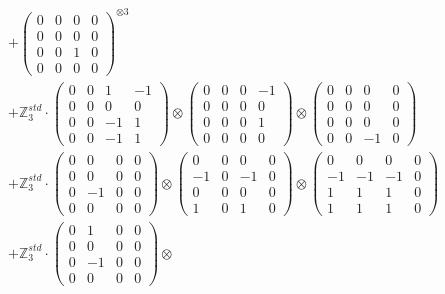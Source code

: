 \documentclass{article}
\begin{document}
{\begin{align}
        &+ \label{Rs16-Rc11-Solution-13-c16} \begin{pmatrix} 0 & 0 & 0 & 0 \\ 0 & 0 & 0 & 0 \\ 0 & 0 & 1 & 0 \\ 0 & 0 & 0 & 0 \end{pmatrix}^{\otimes 3} \\
        &+ \label{Rs16-Rc11-Solution-13-c17} \mathbb{Z}_3^{std} \cdot 
            \begin{pmatrix} 0 & 0 & 1 & -1 \\ 0 & 0 & 0 & 0 \\ 0 & 0 & -1 & 1 \\ 0 & 0 & -1 & 1 \end{pmatrix} \otimes 
            \begin{pmatrix} 0 & 0 & 0 & -1 \\ 0 & 0 & 0 & 0 \\ 0 & 0 & 0 & 1 \\ 0 & 0 & 0 & 0 \end{pmatrix} \otimes 
            \begin{pmatrix} 0 & 0 & 0 & 0 \\ 0 & 0 & 0 & 0 \\ 0 & 0 & 0 & 0 \\ 0 & 0 & -1 & 0 \end{pmatrix} \\ 
        &+ \label{Rs16-Rc11-Solution-13-c18} \mathbb{Z}_3^{std} \cdot 
            \begin{pmatrix} 0 & 0 & 0 & 0 \\ 0 & 0 & 0 & 0 \\ 0 & -1 & 0 & 0 \\ 0 & 0 & 0 & 0 \end{pmatrix} \otimes 
            \begin{pmatrix} 0 & 0 & 0 & 0 \\ -1 & 0 & -1 & 0 \\ 0 & 0 & 0 & 0 \\ 1 & 0 & 1 & 0 \end{pmatrix} \otimes 
            \begin{pmatrix} 0 & 0 & 0 & 0 \\ -1 & -1 & -1 & 0 \\ 1 & 1 & 1 & 0 \\ 1 & 1 & 1 & 0 \end{pmatrix} \\ 
        &+ \label{Rs16-Rc11-Solution-13-c19} \mathbb{Z}_3^{std} \cdot 
            \begin{pmatrix} 0 & 1 & 0 & 0 \\ 0 & 0 & 0 & 0 \\ 0 & -1 & 0 & 0 \\ 0 & 0 & 0 & 0 \end{pmatrix} \otimes 

\end{align}}
\end{document}

